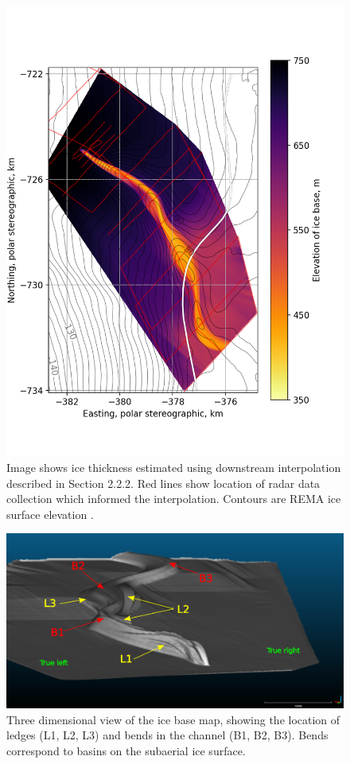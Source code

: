 \begin{figure}[!ht]
\centering
\includegraphics[width=1.1\textwidth]{chapters/2/thickness_solo.png}
\caption[Radargram]{Image shows ice thickness estimated using downstream interpolation described in Section 2.2.2. Red lines show location of radar data collection which informed the interpolation. Contours are REMA ice surface elevation \cite{howat2019reference}.}
\end{figure}

\begin{figure}[!ht]
\centering
\includegraphics[width=1.1\textwidth]{chapters/2/ledges1.png}
\caption[]{Three dimensional view of the ice base map, showing the location of ledges (L1, L2, L3) and bends in the channel (B1, B2, B3). Bends correspond to basins on the subaerial ice surface.}
\end{figure}

